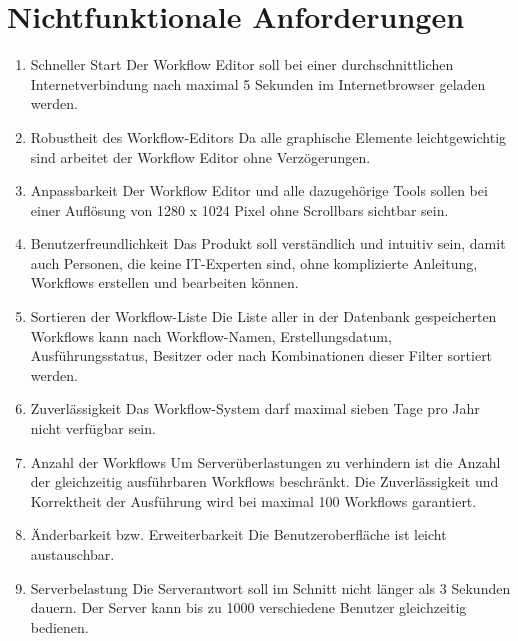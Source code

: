 

\chapter{Nichtfunktionale Anforderungen}
    \begin{enumerate}[font={\bfseries},label={NA\arabic*}0, wide=0pt, labelindent=1em, leftmargin=*]
        
        \item Schneller Start \newline
        Der Workflow Editor soll bei einer durchschnittlichen Internetverbindung nach maximal 5 Sekunden im Internetbrowser geladen werden.
        
        \item Robustheit des Workflow-Editors \newline
        Da alle graphische Elemente leichtgewichtig sind arbeitet der Workflow Editor ohne Verzögerungen.
        
        \item Anpassbarkeit \newline
        Der Workflow Editor und alle dazugehörige Tools sollen bei einer Auflösung von 1280 x 1024 Pixel ohne Scrollbars sichtbar sein.
        
        \item Benutzerfreundlichkeit\newline
        Das Produkt soll verständlich und intuitiv sein, damit auch Personen, die keine IT-Experten sind, ohne komplizierte Anleitung, Workflows erstellen und bearbeiten können.
        
        \item Sortieren der Workflow-Liste\newline
        Die Liste aller in der Datenbank gespeicherten Workflows kann nach Workflow-Namen, Erstellungsdatum, Ausführungsstatus, Besitzer oder nach Kombinationen dieser Filter sortiert werden.
        
        \item Zuverlässigkeit\newline
        Das Workflow-System darf maximal sieben Tage pro Jahr nicht verfügbar sein.
        
        \item Anzahl der Workflows\newline
        Um Serverüberlastungen zu verhindern ist die Anzahl der gleichzeitig ausführbaren Workflows beschränkt. Die Zuverlässigkeit und Korrektheit der Ausführung wird bei maximal 100 Workflows garantiert.
        
        \item Änderbarkeit bzw. Erweiterbarkeit\newline
        Die Benutzeroberfläche ist leicht austauschbar.
        
        \item Serverbelastung\newline
        Die Serverantwort soll im Schnitt nicht länger als 3 Sekunden dauern.
        Der Server kann bis zu 1000 verschiedene Benutzer gleichzeitig bedienen.
        
    \end{enumerate}